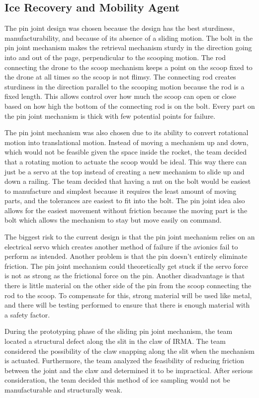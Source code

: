 		\subsection{Ice Recovery and Mobility Agent}
			The pin joint design was chosen because the design has the best sturdiness, manufacturability, and because of its absence of a sliding motion. The bolt in the pin joint mechanism makes the retrieval mechanism sturdy in the direction going into and out of the page, perpendicular to the scooping motion. The rod connecting the drone to the scoop mechanism keeps a point on the scoop fixed to the drone at all times so the scoop is not flimsy. The connecting rod creates sturdiness in the direction parallel to the scooping motion because the rod is a fixed length. This allows control over how much the scoop can open or close based on how high the bottom of the connecting rod is on the bolt. Every part on the pin joint mechanism is thick with few potential points for failure. 

			The pin joint mechanism was also chosen due to its ability to convert rotational motion into translational motion. Instead of moving a mechanism up and down, which would not be feasible given the space inside the rocket, the team decided that a rotating motion to actuate the scoop would be ideal. This way there can just be a servo at the top instead of creating a new mechanism to slide up and down a railing. The team decided that having a nut on the bolt would be easiest to manufacture and simplest because it requires the least amount of moving parts, and the tolerances are easiest to fit into the bolt. The pin joint idea also allows for the easiest movement without friction because the moving part is the bolt which allows the mechanism to stay but move easily on command.

			The biggest risk to the current design is that the pin joint mechanism relies on an electrical servo which creates another method of failure if the avionics fail to perform as intended. Another problem is that the pin doesn’t entirely eliminate friction. The pin joint mechanism could theoretically get stuck if the servo force is not as strong as the frictional force on the pin. Another disadvantage is that there is little material on the other side of the pin from the scoop connecting the rod to the scoop. To compensate for this, strong material will be used like metal, and there will be testing performed to ensure that there is enough material with a safety factor.

			During the prototyping phase of the sliding pin joint mechanism, the team located a structural defect along the slit in the claw of IRMA. The team considered the possibility of the claw snapping along the slit when the mechanism is actuated. Furthermore, the team analyzed the feasibility of reducing friction between the joint and the claw and determined it to be impractical. After serious consideration, the team decided this method of ice sampling would not be manufacturable and structurally weak.

